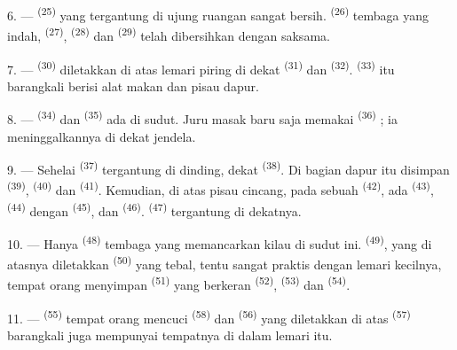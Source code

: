 \VUsaut{4.0mm}
\VUsaut{3.0mm}

6. ---  \textsuperscript{(25)} yang tergantung
di ujung ruangan sangat bersih. 
\textsuperscript{(26)} tembaga yang indah, 
\textsuperscript{(27)},  \textsuperscript{(28)}
dan  \textsuperscript{(29)} telah dibersihkan dengan
saksama.

7. ---  \textsuperscript{(30)} diletakkan di atas
lemari piring di dekat  \textsuperscript{(31)} dan
 \textsuperscript{(32)}. 
\textsuperscript{(33)} itu barangkali berisi alat makan dan pisau
dapur.

8. ---  \textsuperscript{(34)} dan 
\textsuperscript{(35)} ada di sudut. Juru masak baru saja memakai
 \textsuperscript{(36)} ; ia meninggalkannya di
dekat jendela.

9. --- Sehelai  \textsuperscript{(37)} tergantung
di dinding, dekat  \textsuperscript{(38)}. Di bagian
dapur itu disimpan  \textsuperscript{(39)},
 \textsuperscript{(40)} dan 
\textsuperscript{(41)}. Kemudian, di atas pisau cincang, pada sebuah
 \textsuperscript{(42)}, ada 
\textsuperscript{(43)},  \textsuperscript{(44)}
dengan  \textsuperscript{(45)}, dan 
\textsuperscript{(46)}.  \textsuperscript{(47)}
tergantung di dekatnya.

10. --- Hanya  \textsuperscript{(48)} tembaga yang
memancarkan kilau di sudut ini. 
\textsuperscript{(49)}, yang di atasnya diletakkan 
\textsuperscript{(50)} yang tebal, tentu sangat praktis dengan lemari
kecilnya, tempat orang menyimpan 
\textsuperscript{(51)} yang berkeran \textsuperscript{(52)},
 \textsuperscript{(53)} dan  \textsuperscript{(54)}.

\VUsaut{4.0mm}
\VUsaut{3.0mm}

11. ---  \textsuperscript{(55)} tempat orang mencuci
 \textsuperscript{(58)} dan 
\textsuperscript{(56)} yang diletakkan di atas 
\textsuperscript{(57)} barangkali juga mempunyai tempatnya di dalam
lemari itu.

